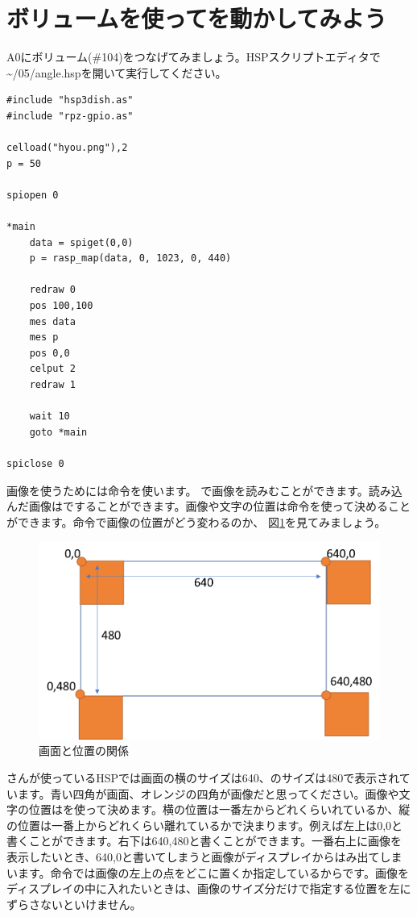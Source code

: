 \newpage
\section{ボリュームを使ってを動かしてみよう}
A0にボリューム(\#104)をつなげてみましょう。HSPスクリプトエディタで\textasciitilde /05/angle.hspを開いて実行してください。\\

\begin{lstlisting}[caption=angle.hsp,label=angle.hsp]
#include "hsp3dish.as"
#include "rpz-gpio.as"

celload("hyou.png"),2
p = 50

spiopen 0

*main
	data = spiget(0,0)
	p = rasp_map(data, 0, 1023, 0, 440)

	redraw 0
	pos 100,100
	mes data
	mes p
	pos 0,0
	celput 2
	redraw 1

	wait 10	
	goto *main

spiclose 0
\end{lstlisting}

画像を使うためには命令を使います。
で画像を読みむことができます。読み込んだ画像はですることができます。画像や文字の位置は命令を使って決めることができます。命令で画像の位置がどう変わるのか、 図\ref{angle.hsp}を見てみましょう。

\begin{figure}[H]
\centering
\includegraphics[scale=0.6]{images/chap05/text05-img034.png}
\caption{画面と位置の関係}
\label{angle.hsp}
\end{figure}

さんが使っているHSPでは画面の横のサイズは640、のサイズは480で表示されています。青い四角が画面、オレンジの四角が画像だと思ってください。画像や文字の位置はを使って決めます。横の位置は一番左からどれくらいれているか、縦の位置は一番上からどれくらい離れているかで決まります。例えば左上は0,0と書くことができます。右下は640,480と書くことができます。一番右上に画像を表示したいとき、640,0と書いてしまうと画像がディスプレイからはみ出てしまいます。命令では画像の左上の点をどこに置くか指定しているからです。画像をディスプレイの中に入れたいときは、画像のサイズ分だけで指定する位置を左にずらさないといけません。\\

